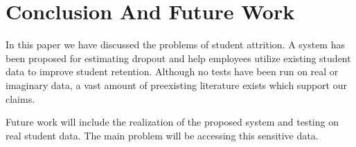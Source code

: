 \chapter{Conclusion And Future Work}
In this paper we have discussed the problems of student attrition.
A system has been proposed for estimating dropout and help employees utilize existing student data to improve student retention.
Although no tests have been run on real or imaginary data, a vast amount of preexisting literature exists which support our claims.

\bigskip\noindent
Future work will include the realization of the proposed system and testing on real student data.
The main problem will be accessing this sensitive data.